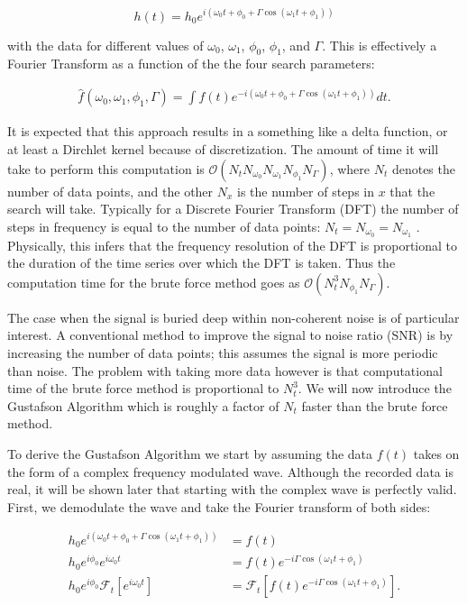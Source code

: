 \documentclass[onecolumn, groupedaddress, 10pt]{revtex4-1}
\begin{document}
\begin{equation}
h(t) = h_0 e^{i\left( \omega_0 t + \phi_0 + \Gamma \cos (\omega_1 t + \phi_1 ) \right)}
\end{equation}

with the data for different values of $\omega_0$, $\omega_1$, $\phi_0$, $\phi_1$, and $\Gamma$.  This is effectively a Fourier Transform as a function of the the four search parameters:

\begin{align}
\hat{f}(\omega_0, \omega_1, \phi_1, \Gamma) = \int f(t) e^{-i\left( \omega_0 t + \phi_0 + \Gamma \cos (\omega_1 t + \phi_1 ) \right)} dt.
\end{align}

It is expected that this approach results in a something like a delta function, or at least a Dirchlet kernel because of discretization.  The amount of time it will take to perform this computation is $\mathcal{O} (N_tN_{\omega_0}N_{\omega_1}N_{\phi_1}N_\Gamma)$, where $N_t$ denotes the number of data points, and the other $N_x$ is the number of steps in $x$ that the search will take.  Typically for a Discrete Fourier Transform (DFT) the number of steps in frequency is equal to the number of data points: $N_t=N_{\omega_0}=N_{\omega_1}$ \cite{}.  Physically, this infers that the frequency resolution of the DFT is proportional to the duration of the time series over which the DFT is taken.  Thus the computation time for the brute force method goes as $\mathcal{O} (N_t^3N_{\phi_1}N_\Gamma)$.  

The case when the signal is buried deep within non-coherent noise is of particular interest.  A conventional method to improve the signal to noise ratio (SNR) is by increasing the number of data points;  this assumes the signal is more periodic than noise. The problem with taking more data however is that computational time of the brute force method is proportional to $N_t^3$.  We will now introduce the Gustafson Algorithm which is roughly a factor of $N_t$ faster than the brute force method.

To derive the Gustafson Algorithm we start by assuming the data $f(t)$ takes on the form of a complex frequency modulated wave. Although the recorded data is real, it will be shown later that starting with the complex wave is perfectly valid.  First, we demodulate the wave and take the Fourier transform of both sides:

\begin{align}
h_0 e^{i\left( \omega_0 t + \phi_0 + \Gamma \cos (\omega_1 t + \phi_1 ) \right)} &= f(t) 												\\
h_0 e^{i\phi_0} e^{i\omega_0 t} &= f(t) e^{-i\Gamma \cos (\omega_1 t + \phi_1)}															\\
h_0 e^{i\phi_0} \mathcal{F}_t \left[ e^{i\omega_0 t} \right] &= \mathcal{F}_t \left[ f(t) e^{-i\Gamma \cos (\omega_1 t + \phi_1)} \right].
\end{align}
\end{document}
